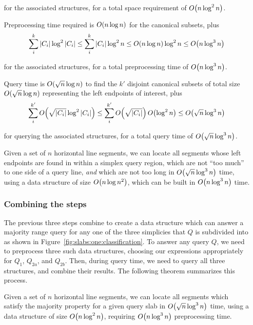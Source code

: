 \noindent for the associated structures, for a total space requirement of $O\!\left(n\log^2{n}\right)$.

Preprocessing time required is $O\!\left(n \log{n}\right)$ for the canonical subsets, plus
\[
\sum_{i}^{k}{|C_i| \log^2{|C_i|}} 
\leq \sum_{i}^{k}{|C_i| \log^2{n}} 
\leq O\!\left(n\log{n}\right) \log^2{n}
\leq O\!\left(n \log^3{n}\right)
\]

\noindent
for the associated structures, for a total preprocessing time of $O\!\left(n \log^3{n}\right)$.

Query time is $O\!\left(\sqrt{n}\log{n}\right)$ to find the $k'$ disjoint canonical subsets of total size $O\!\left(\sqrt{n}\log{n}\right)$ representing the left endpoints of interest, plus
\[
\sum_{i}^{k'}{O\!\left(\sqrt{|C_i|}\log^2{|C_i|}\right)} 
\leq \sum_{i}^{k'}{O\!\left(\sqrt{|C_i|}\right)O\!\left(\log^2{n}\right)} 
\leq O\!\left(\sqrt{n}\log^3{n}\right)
\]

\noindent
for querying the associated structures, for a total query time of $O\!\left(\sqrt{n} \log^3{n}\right)$. 

\begin{lemma}
\label{lem:slabs:one:step3}
Given a set of $n$ horizontal line segments, we can locate all segments whose left endpoints are found in within a simplex query region, which are not ``too much'' to one side of a query line, \emph{and} which are not too long in $O\!\left(\sqrt{n}\log^3{n}\right)$ time, using a data structure of size $O\!\left(n\log{n}^2\right)$, which can be built in $O\!\left(n\log^3{n}\right)$ time.
\end{lemma}

\subsubsection{Combining the steps}

The previous three steps combine to create a data structure which can answer a majority range query for any one of the three simplicies that $Q$ is subdivided into as shown in Figure~\ref{fig:slabs:one:classification}.  To answer any query $Q$, we need to preprocess three such data structures, choosing our expressions appropriately for $Q_1$, $Q_{2a}$, and $Q_{2b}$.  Then, during query time, we need to query all three structures, and combine their results. The following theorem summarizes this process.

\begin{theorem}
\label{thm:slabs:one}
Given a set of $n$ horizontal line segments, we can locate all segments which satisfy the majority property for a given query slab in $O\!\left(\sqrt{n}\log^3{n}\right)$ time, using a data structure of size $O\!\left(n\log^2{n}\right)$, requiring $O\!\left(n\log^3{n}\right)$ preprocessing time.
\end{theorem}


